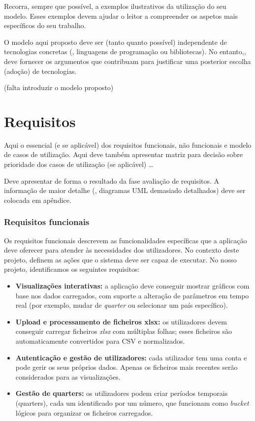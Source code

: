 Recorra, sempre que possível, a exemplos ilustrativos da utilização do seu modelo. Esses exemplos devem ajudar o leitor a compreender os aspetos mais específicos do seu trabalho.

O modelo aqui proposto deve ser (tanto quanto possível) independente de tecnologias concretas (\eg, linguagens de programação ou bibliotecas). No entanto,, deve fornecer os argumentos que contribuam para justificar uma posterior escolha (adoção) de tecnologias.


(falta introduzir o modelo proposto)


\section{Requisitos}
\label{sec:requisitos}

Aqui o essencial (e se aplicável) dos requisitos funcionais, não funcionais e modelo de casos de utilização. Aqui deve também apresentar matriz para decisão sobre prioridade dos casos de utilização (se aplicável) \ldots

Deve apresentar de forma  o resultado da fase avaliação de requisitos. A informação de maior detalhe (\eg, diagramas UML demasiado detalhados) deve ser colocada em apêndice.

\subsubsection{Requisitos funcionais}
Os requisitos funcionais descrevem as funcionalidades específicas que a aplicação deve oferecer para atender às necessidades dos utilizadores. No contexto deste projeto, definem as ações que o sistema deve ser capaz de executar. No nosso projeto, identificamos os seguintes requisitos:

\begin{itemize}
    \item \textbf{Visualizações interativas:} a aplicação deve conseguir mostrar gráficos com base nos dados carregados, com suporte a alteração de parâmetros em tempo real (por exemplo, mudar de \textit{quarter} ou selecionar um país específico).
    \item \textbf{Upload e processamento de ficheiros \gls{xlsx}:} os utilizadores devem conseguir carregar ficheiros \textit{\gls{xlsx}} com múltiplas folhas; esses ficheiros são automaticamente convertidos para CSV e normalizados.
    \item \textbf{Autenticação e gestão de utilizadores:} cada utilizador tem uma conta e pode gerir os seus próprios dados. Apenas os ficheiros mais recentes serão considerados para as visualizações.
    \item \textbf{Gestão de quarters:} os utilizadores podem criar períodos temporais (quarters), cada um identificado por um número, que funcionam como \textit{bucket} lógicos para organizar os ficheiros carregados.
\end{itemize}

